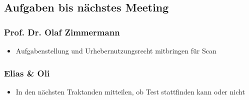 \hypertarget{aufgaben-bis-nuxe4chstes-meeting}{%
\subsection*{Aufgaben bis nächstes
Meeting}\label{aufgaben-bis-nuxe4chstes-meeting}}

\hypertarget{prof-dr-olaf-zimmermann}{%
\subsubsection*{Prof. Dr. Olaf
Zimmermann}\label{prof-dr-olaf-zimmermann}}

\begin{itemize}

\item
  Aufgabenstellung und Urhebernutzungsrecht mitbringen für Scan
\end{itemize}

\hypertarget{elias--oli}{%
\subsubsection*{Elias \& Oli}\label{elias--oli}}

\begin{itemize}

\item
  In den nächsten Traktanden mitteilen, ob Test stattfinden kann oder
  nicht
\end{itemize}